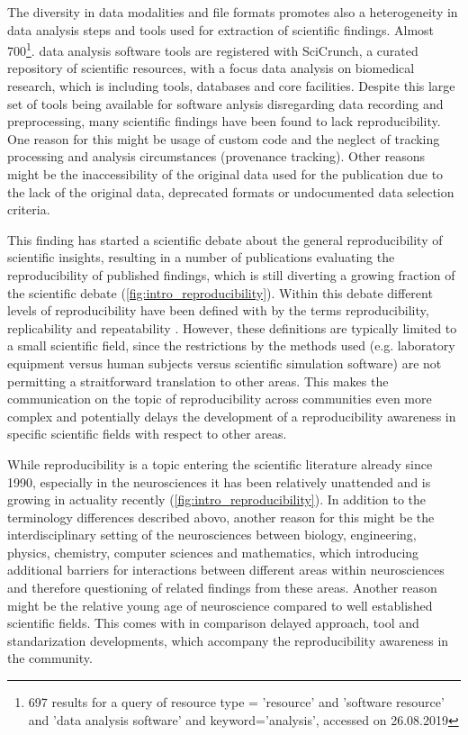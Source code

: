 The diversity in data modalities and file formats promotes also a heterogeneity in data analysis steps and tools used for extraction of scientific findings. Almost 700\footnote{697 results for a query of resource type = 'resource' and 'software resource' and 'data analysis software' and keyword='analysis', accessed on 26.08.2019}. data analysis software tools are registered with SciCrunch, a curated repository of scientific resources, with a focus data analysis on biomedical research, which is including tools, databases and core facilities. Despite this large set of tools being available for software anlysis disregarding data recording and preprocessing, many scientific findings have been found to lack reproducibility. One reason for this might be usage of custom code and the neglect of tracking processing and analysis circumstances (provenance tracking). Other reasons might be the inaccessibility of the original data used for the publication due to the lack of the original data, deprecated formats or undocumented data selection criteria.

This finding has started a scientific debate about the general reproducibility of scientific insights, resulting in a number of publications evaluating the reproducibility of published findings, which is still diverting a growing fraction of the scientific debate (\cref{fig:intro_reproducibility}). Within this debate different levels of reproducibility have been defined with by the terms reproducibility, replicability and repeatability \citep{Plesser_2018}. However, these definitions are typically limited to a small scientific field, since the restrictions by the methods used (e.g. laboratory equipment versus human subjects versus scientific simulation software) are not permitting a straitforward translation to other areas. This makes the communication on the topic of reproducibility across communities even more complex and potentially delays the development of a reproducibility awareness in specific scientific fields with respect to other areas.

While reproducibility is a topic entering the scientific literature already since 1990, especially in the neurosciences it has been relatively unattended and is growing in actuality recently (\cref{fig:intro_reproducibility}). In addition to the terminology differences described abovo, another reason for this might be the interdisciplinary setting of the neurosciences between biology, engineering, physics, chemistry, computer sciences and mathematics, which introducing additional barriers for interactions between different areas within neurosciences and therefore questioning of related findings from these areas. Another reason might be the relative young age of neuroscience compared to well established scientific fields. This comes with in comparison delayed approach, tool and standarization developments, which accompany the reproducibility awareness in the community.

